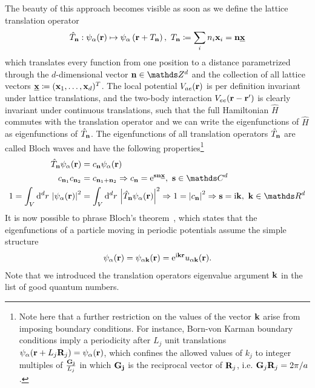 The beauty of this approach becomes visible as soon as we define the lattice translation operator
\begin{align}
    \hat T_{\bf n} : \psi_\alpha({\bf r}) \mapsto \psi_\alpha\left( {\bf r}+T_{\bf n} \right),\ T_{\bf n}\coloneqq\sum_i n_i {\bf x}_i={\bf n}\underline{\bf x}
\end{align}
which translates every function from one position to a distance parametrized through the $d$-dimensional vector ${\bf n}\in\mathds Z^d$ and the collection of all lattice vectors $\underline{\bf x}\coloneqq ({\bf x}_1,\dots,{\bf x}_d)^T$.
The local potential $V_{ae}({\bf r})$ is per definition invariant under lattice translations, and the two-body interaction $V_{ee}({\bf r}-{\bf r'})$ is clearly invariant under continuous translations, such that the full Hamiltonian $\hat H$ commutes with the translation operator and we can write the eigenfunctions of $\hat H$ as eigenfunctions of $\hat T_{\bf n}$.
The eigenfunctions of all translation operators $\hat T_{\bf n}$ are called Bloch waves and have the following properties\footnote{Note here that a further restriction on the values of the vector ${\bf k}$ arise from imposing boundary conditions. For instance, Born-von Karman boundary conditions imply a periodicity after $L_j$ unit translations $\psi_\alpha({\bf r}+ L_j{\bf R}_j)=\psi_\alpha({\bf r})$, which confines the allowed values of $k_j$ to integer multiples of $\frac{\bf G_j}{L_j}$ in which $\bf G_j$ is the reciprocal vector of ${\bf R}_j$, i.e. ${\bf G}_j {\bf R}_j = 2\pi/a$.}
\begin{align}
    \hat T_{\bf n}\psi_{\alpha}({\bf r}) &= c_{\bf n}\psi_{\alpha}({\bf r})\\
    c_{{\bf n}_1}c_{{\bf n}_2} &= c_{{\bf n}_1+{\bf n}_2} \Rightarrow c_{\bf n} = \re^{{\bf s}{\bf n}\underline{\bf x}},\ {\bf s}\in\mathds C^d\\
    1=\int_V\rd^dr\,\abs{\psi_{\alpha}({\bf r})}^2 &= \int_V\rd^dr\,\abs{\hat T_{\bf n}\psi_{\alpha}({\bf r})}^2 \Rightarrow 1=\abs{c_{\bf n}}^2 \Rightarrow {\bf s}=\ri{\bf k},\ {\bf k}\in\mathds R^d
\end{align}
It is now possible to phrase Bloch's theorem~\cite{Bloch1929}, which states that the eigenfunctions of a particle moving in periodic potentials assume the simple structure
\begin{align}
    \psi_\alpha({\bf r}) = \psi_{\alpha{\bf k}}({\bf r}) = \mathrm e^{\mathrm i{\bf k}{\bf r}}u_{\alpha{\bf k}}({\bf r}).
    \label{eq:bloch_theorem}
\end{align}
Note that we introduced the translation operators eigenvalue argument $\bf k$ in the list of good quantum numbers.
